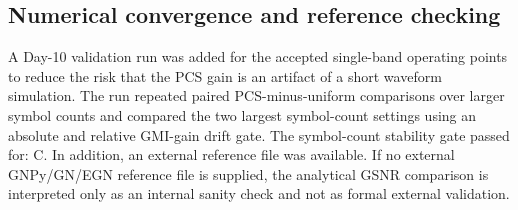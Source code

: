 \subsection{Numerical convergence and reference checking}
A Day-10 validation run was added for the accepted single-band operating points to reduce the risk that the PCS gain is an artifact of a short waveform simulation. The run repeated paired PCS-minus-uniform comparisons over larger symbol counts and compared the two largest symbol-count settings using an absolute and relative GMI-gain drift gate. The symbol-count stability gate passed for: C. In addition, an external reference file was available. If no external GNPy/GN/EGN reference file is supplied, the analytical GSNR comparison is interpreted only as an internal sanity check and not as formal external validation.
